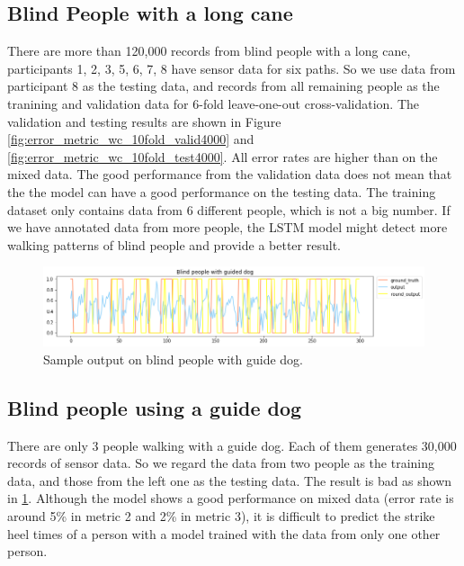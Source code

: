 \documentclass[11pt]{article}
\begin{document}
{\subsection{Blind People with a long cane}
There are more than 120,000 records from blind people with a long cane, participants 1, 2, 3, 5, 6, 7, 8 have sensor data for six paths. So we use data from participant 8 as the testing data, and records from all remaining people as the tranining and validation data for 6-fold leave-one-out cross-validation. The validation and testing results are shown in Figure \ref{fig:error_metric_wc_10fold_valid4000} and \ref{fig:error_metric_wc_10fold_test4000}. All error rates are higher than on the mixed data. The good performance from the validation data does not mean that the the model can have a good performance on the testing data.
The training dataset only contains data from 6 different people, which is not a big number. If we have annotated data from more people, the LSTM model might detect more walking patterns of blind people and provide a better result.

\begin{figure}[ht]
\centering
\includegraphics[scale=0.5]{blind_gd}
\caption{Sample output on blind people with guide dog.}
\label{fig:blind_gd}
\end{figure}


\subsection{Blind people using a guide dog}

There are only 3 people walking with a guide dog. Each of them generates 30,000 records of sensor data. So we regard the data from two people as the training data, and those from the left one as the testing data. The result is bad as shown in \ref{fig:blind_gd}. Although the model shows a  good performance on mixed data (error rate is around 5\% in metric 2 and 2\% in metric 3), it is difficult to predict the strike heel times of a person with a model trained with the data from only one other person.

}
\end{document}
